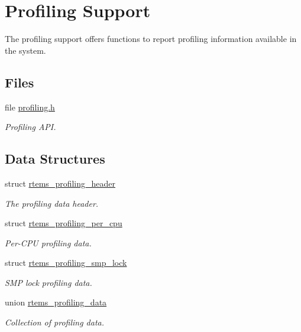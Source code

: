 \hypertarget{group__Profiling}{}\section{Profiling Support}
\label{group__Profiling}


The profiling support offers functions to report profiling information available in the system.  


\subsection*{Files}
\begin{DoxyCompactItemize}
\item 
file \mbox{\hyperlink{profiling_8h}{profiling.\+h}}
\begin{DoxyCompactList}\small\item\em Profiling A\+PI. \end{DoxyCompactList}\end{DoxyCompactItemize}
\subsection*{Data Structures}
\begin{DoxyCompactItemize}
\item 
struct \mbox{\hyperlink{structrtems__profiling__header}{rtems\+\_\+profiling\+\_\+header}}
\begin{DoxyCompactList}\small\item\em The profiling data header. \end{DoxyCompactList}\item 
struct \mbox{\hyperlink{structrtems__profiling__per__cpu}{rtems\+\_\+profiling\+\_\+per\+\_\+cpu}}
\begin{DoxyCompactList}\small\item\em Per-\/\+C\+PU profiling data. \end{DoxyCompactList}\item 
struct \mbox{\hyperlink{structrtems__profiling__smp__lock}{rtems\+\_\+profiling\+\_\+smp\+\_\+lock}}
\begin{DoxyCompactList}\small\item\em S\+MP lock profiling data. \end{DoxyCompactList}\item 
union \mbox{\hyperlink{unionrtems__profiling__data}{rtems\+\_\+profiling\+\_\+data}}
\begin{DoxyCompactList}\small\item\em Collection of profiling data. \end{DoxyCompactList}\end{DoxyCompactItemize}
